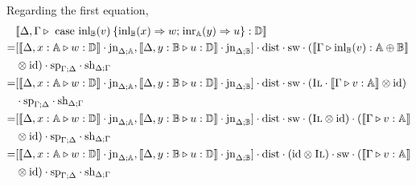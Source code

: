 \vspace{10pt}

Regarding the first equation,
\begin{equation*}
  \begin{split}
    & \llbracket \Delta,\Gamma \triangleright  \text{ case } \text{inl}_{\mathbb{B}}(v) \hspace{2pt} \{\text{inl}_{\mathbb{B}} (x) \Rightarrow w ; \hspace{1pt} \text{inr}_{\mathbb{A}} (y) \Rightarrow u\}: \mathbb{D}\rrbracket \\
    = & [\llbracket\Delta, x: \mathbb{A} \triangleright w: \mathbb{D}\rrbracket \cdot \text{jn}_{\Delta;\mathbb{A}},\llbracket\Delta, y: \mathbb{B} \triangleright u: \mathbb{D}\rrbracket\cdot \text{jn}_{\Delta;\mathbb{B}}] \cdot \text{dist} \cdot \text{sw} \cdot (\llbracket\Gamma \triangleright \text{inl}_{\mathbb{B}}(v): \mathbb{A} \oplus \mathbb{B}\rrbracket  \\
    &\otimes \text{id}) \cdot \text{sp}_{\Gamma;\Delta} \cdot \text{sh}_{\Delta;\Gamma} \\
    = & [\llbracket\Delta, x: \mathbb{A} \triangleright w: \mathbb{D}\rrbracket \cdot \text{jn}_{\Delta;\mathbb{A}},\llbracket\Delta, y: \mathbb{B} \triangleright u: \mathbb{D}\rrbracket \cdot \text{jn}_{\Delta;\mathbb{B}}] \cdot \text{dist} \cdot \text{sw} \cdot (\textsc{Il} \cdot\llbracket \Gamma \triangleright v: \mathbb{A} \rrbracket \otimes  \text{id}) \\
    & \cdot \text{sp}_{\Gamma;\Delta} \cdot \text{sh}_{\Delta;\Gamma} \\
    = & [\llbracket\Delta, x: \mathbb{A} \triangleright w: \mathbb{D}\rrbracket \cdot \text{jn}_{\Delta;\mathbb{A}},\llbracket\Delta, y: \mathbb{B} \triangleright u: \mathbb{D}\rrbracket\cdot \text{jn}_{\Delta;\mathbb{B}}] \cdot \text{dist} \cdot \text{sw} \cdot (\textsc{Il} \otimes \text{id})  \cdot (\llbracket  \Gamma \triangleright v: \mathbb{A} \rrbracket   \\
    &\otimes  \text{id}) \cdot \text{sp}_{\Gamma;\Delta} \cdot \text{sh}_{\Delta;\Gamma} \\
    = & [\llbracket\Delta, x: \mathbb{A} \triangleright w: \mathbb{D}\rrbracket \cdot \text{jn}_{\Delta;\mathbb{A}} ,\llbracket\Delta, y: \mathbb{B} \triangleright u: \mathbb{D}\rrbracket \cdot \text{jn}_{\Delta;\mathbb{B}}] \cdot \text{dist}  \cdot (\text{id} \otimes \textsc{Il}) \cdot   \text{sw} \cdot(\llbracket\Gamma \triangleright v: \mathbb{A} \rrbracket \\\ 
    &\otimes  \text{id})  \cdot \text{sp}_{\Gamma;\Delta} \cdot \text{sh}_{\Delta;\Gamma} \\
  \end{split}
\end{equation*}



